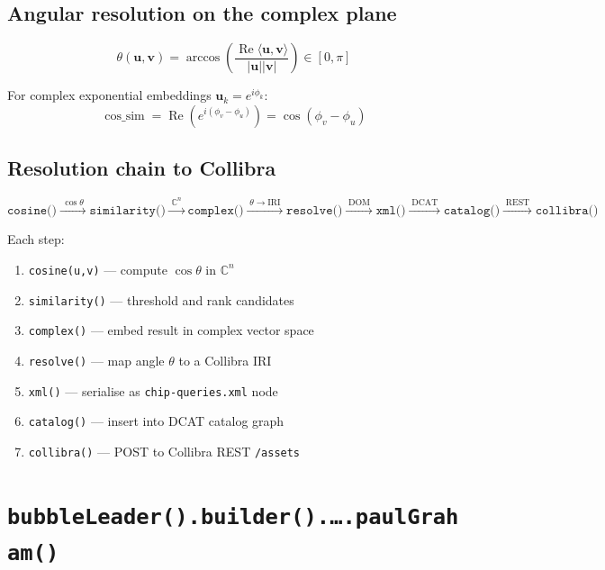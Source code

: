 \documentclass[12pt,a4paper]{article}
\DeclareMathOperator{\cossim}{cos\_sim}
\begin{document}
\subsection{Angular resolution on the complex plane}

\[
  \theta(\mathbf{u},\mathbf{v})
  = \arccos\!\left(\frac{\operatorname{Re}\langle\mathbf{u},\mathbf{v}\rangle}{|\mathbf{u}||\mathbf{v}|}\right)
  \in [0, \pi]
\]

For complex exponential embeddings $\mathbf{u}_k = e^{i\phi_k}$:
\[
  \cossim = \operatorname{Re}\!\left(e^{i(\phi_v - \phi_u)}\right) = \cos(\phi_v - \phi_u)
\]

\subsection{Resolution chain to Collibra}

\[
  \texttt{cosine()} \xrightarrow{\;\cos\theta\;} \texttt{similarity()}
  \xrightarrow{\;\mathbb{C}^n\;} \texttt{complex()}
  \xrightarrow{\;\theta \to \text{IRI}\;} \texttt{resolve()}
  \xrightarrow{\;\text{DOM}\;} \texttt{xml()}
  \xrightarrow{\;\text{DCAT}\;} \texttt{catalog()}
  \xrightarrow{\;\text{REST}\;} \texttt{collibra()}
\]

Each step:
\begin{enumerate}
  \item \texttt{cosine(u,v)} — compute $\cos\theta$ in $\mathbb{C}^n$
  \item \texttt{similarity()} — threshold and rank candidates
  \item \texttt{complex()} — embed result in complex vector space
  \item \texttt{resolve()} — map angle $\theta$ to a Collibra IRI
  \item \texttt{xml()} — serialise as \texttt{chip-queries.xml} node
  \item \texttt{catalog()} — insert into DCAT catalog graph
  \item \texttt{collibra()} — POST to Collibra REST \texttt{/assets}
\end{enumerate}

\section{\texttt{bubbleLeader().builder().\ldots.paulGraham()}}
\label{sec:bubble}
\end{document}
